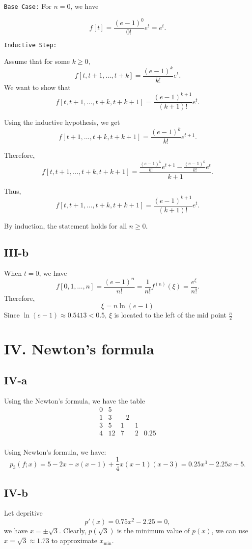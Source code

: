 \documentclass[a4paper]{article}
\begin{document}
\texttt{Base Case:}
For \(n = 0\), we have 

\[
f[t] = \frac{(e-1)^0}{0!}e^t = e^t.
\]

\texttt{Inductive Step:}

Assume that for some \(k \geq 0\), 
\[
f[t,t+1,\dots,t+k] = \frac{(e-1)^k}{k!}e^t.
\]
We want to show that 
\[
f[t,t+1,\dots,t+k,t+k+1] = \frac{(e-1)^{k+1}}{(k+1)!}e^t.
\]

Using the inductive hypothesis, we get
\[
f[t+1,\dots,t+k,t+k+1] = \frac{(e-1)^k}{k!}e^{t+1}.
\]

Therefore,
\[
f[t,t+1,\dots,t+k,t+k+1] = \frac{\frac{(e-1)^k}{k!}e^{t+1} - \frac{(e-1)^k}{k!}e^t}{k+1}.
\]

Thus,
\[
f[t,t+1,\dots,t+k,t+k+1] = \frac{(e-1)^{k+1}}{(k+1)!}e^t.
\]

By induction, the statement holds for all \(n \geq 0\).

\subsection*{III-b}

When $t = 0$, we have
\[
    f[0,1,\dots,n] = \frac{(e-1)^n}{n!} = \frac{1}{n!}f^{(n)}(\xi) = \frac{e^{\xi}}{n!}.
\]
Therefore,
\[
    \xi = n\ln (e-1) 
\]
Since $\ln (e-1) \approx 0.5413 < 0.5$, $\xi$ is located to the left of the mid point $\frac{n}{2}$
\section*{IV. Newton's formula}
\subsection*{IV-a}
Using the Newton's formula, we have the table
\[
\begin{array}{c|cccc}

0 & 5 &  &  &  \\
1 & 3 & -2 &  & \\
3 & 5 & 1 & 1& \\
4 & 12 & 7 &2 & 0.25\\
\end{array}
\]

Using Newton's formula, we have:
\[
p_3(f;x) = 5 - 2x + x(x-1) + \frac{1}{4}x(x-1)(x-3) = 0.25x^3 - 2.25x + 5.
\]

\subsection*{IV-b}
Let depritive \[p'(x) = 0.75x^2 - 2.25 = 0,\] we have $x = \pm \sqrt{3}$. Clearly, $p(\sqrt{3})$ is the minimum value of $p(x)$, we can use $x = \sqrt{3} \approx 1.73$ to approximate $x_{\min}$.
\end{document}
